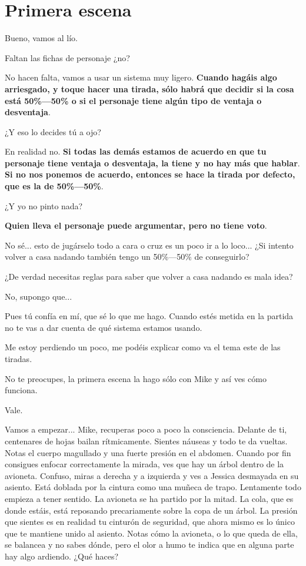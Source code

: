 \documentclass[10pt, a5paper, twocolumn]{article}
\newenvironment{dialogue}
    {\begin{description}[leftmargin=!,align=right,labelwidth=0.cm]}
    {\end{description}}
\newcommand\A{\item[\raisebox{-0.25em}{\scalebox{0.75}{\bctetraedre}}]}
\newcommand\B{\item[\raisebox{-0.25em}{\scalebox{0.75}{\bccube}}]}
\newcommand\E{\item[\raisebox{-0.25em}{\scalebox{0.75}{\bcicosaedre}}]}
\begin{document}
    \section*{Primera escena} %

    \begin{dialogue}
        \E Bueno, vamos al lío.
        \B Faltan las fichas de personaje ¿no?
        \E No hacen falta, vamos a usar un sistema muy ligero. \textbf{Cuando hagáis algo arriesgado, y toque hacer una tirada, sólo habrá que decidir si la cosa está 50$\!$\%---50$\!$\% o si el personaje tiene algún tipo de ventaja o desventaja}.
        \B ¿Y eso lo decides tú a ojo?
        \E En realidad no. \textbf{Si todas las demás estamos de acuerdo en que tu personaje tiene ventaja o desventaja, la tiene y no hay más que hablar}. \textbf{Si no nos ponemos de acuerdo, entonces se hace la tirada por defecto, que es la de 50$\!$\%---50$\!$\%}.
        \B ¿Y yo no pinto nada?
        \E \textbf{Quien lleva el personaje puede argumentar, pero no tiene voto}.
        \B No sé... esto de jugárselo todo a cara o cruz es un poco ir a lo loco... ¿Si intento volver a casa nadando también tengo un 50$\!$\%---50$\!$\% de conseguirlo?
        \E ¿De verdad necesitas reglas para saber que volver a casa nadando es mala idea?
        \B No, supongo que...
        \E Pues tú confía en mí, que sé lo que me hago. Cuando estés metida en la partida no te vas a dar cuenta de qué sistema estamos usando.
        \A Me estoy perdiendo un poco, me podéis explicar como va el tema este de las tiradas.
        \E No te preocupes, la primera escena la hago sólo con Mike y así ves cómo funciona.
        \A Vale.
        \E Vamos a empezar... Mike, recuperas poco a poco la consciencia. Delante de ti, centenares de hojas bailan rítmicamente. Sientes náuseas y todo te da vueltas. Notas el cuerpo magullado y una fuerte presión en el abdomen. Cuando por fin consigues enfocar correctamente la mirada, ves que hay un árbol dentro de la avioneta. Confuso, miras a derecha y a izquierda y ves a Jessica desmayada en su asiento. Está doblada por la cintura como una muñeca de trapo. Lentamente todo empieza a tener sentido. La avioneta se ha partido por la mitad. La cola, que es donde estáis, está reposando precariamente sobre la copa de un árbol. La presión que sientes es en realidad tu cinturón de seguridad, que ahora mismo es lo único que te mantiene unido al asiento. Notas cómo la avioneta, o lo que queda de ella, se balancea y no sabes dónde, pero el olor a humo te indica que en alguna parte hay algo ardiendo. ¿Qué haces?

\end{dialogue}
\end{document}
